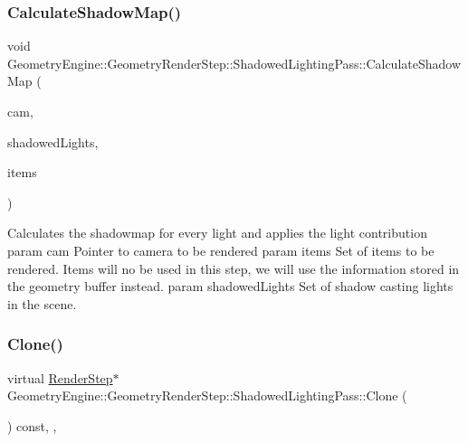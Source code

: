 \subsubsection{\texorpdfstring{CalculateShadowMap()}{CalculateShadowMap()}}
{\footnotesize\ttfamily void Geometry\+Engine\+::\+Geometry\+Render\+Step\+::\+Shadowed\+Lighting\+Pass\+::\+Calculate\+Shadow\+Map (\begin{DoxyParamCaption}\item[{\mbox{\hyperlink{class_geometry_engine_1_1_geometry_world_item_1_1_geometry_camera_1_1_camera}{Geometry\+World\+Item\+::\+Geometry\+Camera\+::\+Camera}} $\ast$}]{cam,  }\item[{std\+::unordered\+\_\+set$<$ \mbox{\hyperlink{class_geometry_engine_1_1_geometry_world_item_1_1_geometry_light_1_1_light}{Geometry\+World\+Item\+::\+Geometry\+Light\+::\+Light}} $\ast$ $>$ $\ast$}]{shadowed\+Lights,  }\item[{std\+::unordered\+\_\+set$<$ \mbox{\hyperlink{class_geometry_engine_1_1_geometry_world_item_1_1_geometry_item_1_1_geometry_item}{Geometry\+World\+Item\+::\+Geometry\+Item\+::\+Geometry\+Item}} $\ast$ $>$ $\ast$}]{items }\end{DoxyParamCaption})\hspace{0.3cm}{\ttfamily [protected]}}

Calculates the shadowmap for every light and applies the light contribution param cam Pointer to camera to be rendered param items Set of items to be rendered. Items will no be used in this step, we will use the information stored in the geometry buffer instead. param shadowed\+Lights Set of shadow casting lights in the scene. \mbox{\label{class_geometry_engine_1_1_geometry_render_step_1_1_shadowed_lighting_pass_a73176d6860aee0903034eeaf93edb40d}} 
\subsubsection{\texorpdfstring{Clone()}{Clone()}}
{\footnotesize\ttfamily virtual \mbox{\hyperlink{class_geometry_engine_1_1_geometry_render_step_1_1_render_step}{Render\+Step}}$\ast$ Geometry\+Engine\+::\+Geometry\+Render\+Step\+::\+Shadowed\+Lighting\+Pass\+::\+Clone (\begin{DoxyParamCaption}{ }\end{DoxyParamCaption}) const\hspace{0.3cm}{\ttfamily [inline]}, {\ttfamily [override]}, {\ttfamily [virtual]}}

